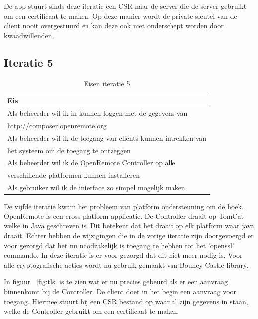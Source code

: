 \documentclass[]{article}
\begin{document}
De app stuurt sinds deze iteratie een CSR naar de server die de server
gebruikt om een certificaat te maken. Op deze manier wordt de private
sleutel van de client nooit overgestuurd en kan deze ook niet onderschept
worden door kwaadwillenden.

\subsection{Iteratie 5}
\begin{table}[htpb]
  \caption{Eisen iteratie 5}
  \begin{center}
    \begin{tabular}{|| l ||}\hline
        Eis                                                              \\\hline\hline
        Als beheerder wil ik in kunnen loggen met de gegevens van        \\
        http://composer.openremote.org                                   \\\hline
        Als beheerder wil ik de toegang van clients kunnen intrekken van \\ 
        het systeem om de toegang te ontzeggen                           \\\hline
        Als beheerder wil ik de OpenRemote Controller op alle            \\ 
        verschillende platformen kunnen installeren                      \\\hline
        Als gebruiker wil ik de interface zo simpel mogelijk maken       \\\hline
    \end{tabular}
  \end{center}
\end{table}

De vijfde iteratie kwam het probleem van platform ondersteuning om de hoek.
OpenRemote is een cross platform applicatie. De Controller draait op TomCat
welke in Java geschreven is. Dit betekent dat het draait op elk platform waar
java draait. Echter hebben de wijzigingen die in de vorige iteratie zijn
doorgevoergd er voor gezorgd dat het nu noodzakelijk is toegang te hebben tot
het 'openssl' commando. In deze iteratie is er voor gezorgd dat dit niet meer
nodig is. Voor alle cryptografische acties wordt nu gebruik gemaakt van Bouncy
Castle library. 

In figuur ~\ref{fig:tls} is te zien wat er nu precies gebeurd als er een
aanvraag binnenkomt bij de Controller. De client doet in het begin een aanvraag
voor toegang. Hiermee stuurt hij een CSR bestand op waar al zijn gegevens in staan,
welke de Controller gebruikt om een certificaat te maken. 
\end{document}
